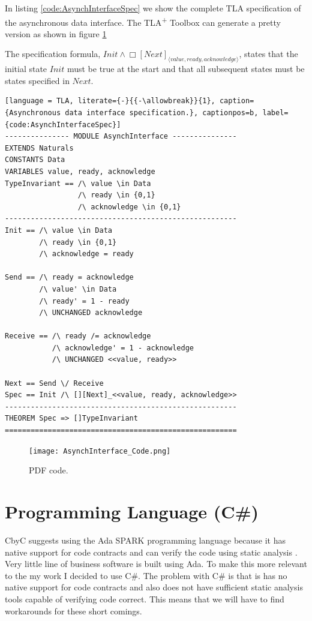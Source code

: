 In listing \ref{code:AsynchInterfaceSpec} we show the complete TLA specification of the 
asynchronous data interface. The TLA\textsuperscript{+} Toolbox can generate a 
pretty version as shown in figure \ref{fig:PDFCode}

The specification formula, \( Init \land \Box\left[ Next \right]_{\langle value, ready, acknowledge \rangle} \),
states that the initial state \(Init\) must be true at the start and that all 
subsequent states must be states specified in \(Next\).

\begin{lstlisting}[language = TLA, literate={-}{{-\allowbreak}}{1}, caption={Asynchronous data interface specification.}, captionpos=b, label={code:AsynchInterfaceSpec}]
--------------- MODULE AsynchInterface ---------------
EXTENDS Naturals
CONSTANTS Data
VARIABLES value, ready, acknowledge
TypeInvariant == /\ value \in Data
                 /\ ready \in {0,1}
                 /\ acknowledge \in {0,1}             
------------------------------------------------------
Init == /\ value \in Data
        /\ ready \in {0,1}
        /\ acknowledge = ready
        
Send == /\ ready = acknowledge
        /\ value' \in Data
        /\ ready' = 1 - ready
        /\ UNCHANGED acknowledge
        
Receive == /\ ready /= acknowledge
           /\ acknowledge' = 1 - acknowledge
           /\ UNCHANGED <<value, ready>>
              
Next == Send \/ Receive
Spec == Init /\ [][Next]_<<value, ready, acknowledge>>
------------------------------------------------------
THEOREM Spec => []TypeInvariant
======================================================
\end{lstlisting}

\begin{figure}[H]
	\centering
	\texttt{[image: AsynchInterface\_Code.png]}
	\decoRule
	\caption{PDF code.}
	\label{fig:PDFCode}
\end{figure}

\section{Programming Language (C\#)}

CbyC suggests using the Ada SPARK programming language because it has native
support for code contracts and can verify the code using static analysis \parencite{CbyCPraxis}.
Very little line of business software is built using Ada. To make this more relevant 
to the my work I decided to use C\#. The problem with C\# is that is has no native
support for code contracts and also does not have sufficient static analysis tools 
capable of verifying code correct. This means that we will have to find workarounds
for these short comings. 


